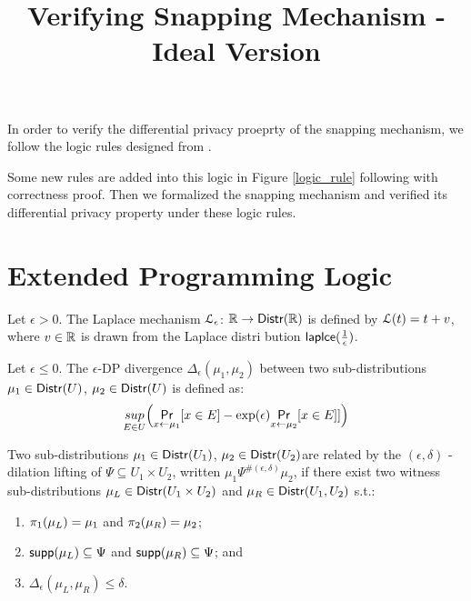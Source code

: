 \documentclass[a4paper,11pt]{article}
\begin{document}
\title{Verifying Snapping Mechanism - Ideal Version}
\author{}

\date{}

\maketitle
In order to verify the differential privacy proeprty of the snapping mechanism\cite{mironov2012significance}, we follow the logic rules designed from \cite{barthe2016proving}.

Some new rules are added into this logic in Figure \ref{logic_rule} following with correctness proof. Then we formalized the snapping mechanism and verified its differential privacy property under these logic rules.

\section{Extended Programming Logic\cite{barthe2016proving}}
\begin{defn}
Let $\epsilon > 0$. The Laplace mechanism  $\mathcal{L}_{\epsilon}$: $\mathbb{R} \to \mathsf{Distr}(\mathbb{R})$ is defined by $\mathcal{L}(t) = t + v$, where $v \in \mathbb{R}$ is drawn from the Laplace distri bution $\mathsf{laplce}(\frac{1}{\epsilon})$.
\end{defn}

\begin{defn}
Let $\epsilon \leq 0$. The $\epsilon${\text -DP divergence} $\Delta_{\epsilon}(\mu_1, \mu_2)$ between two sub-distributions $\mu_1 \in \mathsf{Distr}(U)$, $\mu_2 \in \mathsf{Distr}(U)$ is defined as:
\[	
	\underset{E \in U}{sup}\Big(\underset{x \leftarrow \mu_1}{\mathsf{Pr}}[x \in E] - \exp(\epsilon) \underset{x \leftarrow \mu_2}{\mathsf{Pr}}[x \in  E]]\Big)
\]

\end{defn}

\begin{defn}
Two sub-distributions $\mu_1 \in \mathsf{Distr}(U_1)$, $\mu_2 \in \mathsf{Distr}(U_2)$are related by the $(\epsilon, \delta)$ - dilation lifting of $\Psi \subseteq U_1 \times U_2$, written $\mu_1 \Psi^{\#(\epsilon, \delta)} \mu_2$, if there exist two witness sub-distributions $\mu_L \in \mathsf{Distr}(U_1 \times U_2)$ and $\mu_R \in \mathsf{Distr}(U_1, U_2)$ s.t.:
\begin{enumerate}
	\item $\pi_1(\mu_L) = \mu_1$ and $\pi_2(\mu_R) = \mu_2$;
	\item $\mathsf{supp}(\mu_L) \subseteq \Psi$ and $\mathsf{supp}(\mu_R) \subseteq \Psi$; and
	\item $\Delta_{\epsilon}(\mu_L, \mu_R) \leq \delta$.
\end{enumerate}
\end{defn}
\end{document}
